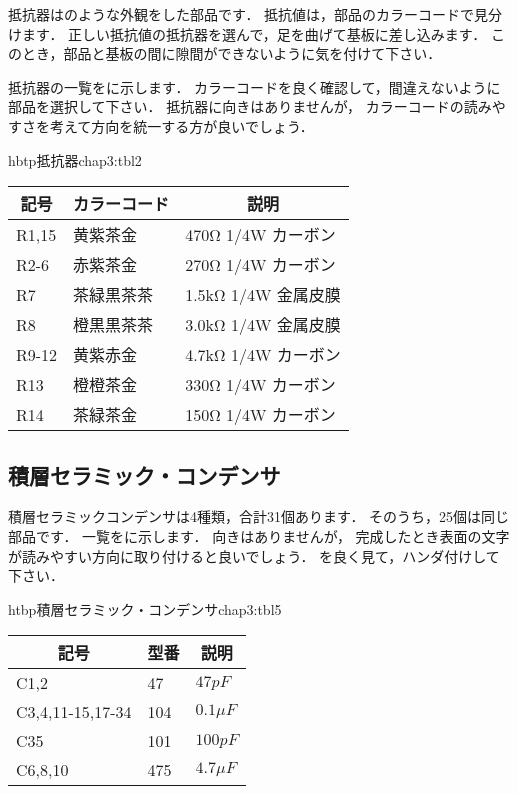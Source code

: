 抵抗器はのような外観をした部品です．
抵抗値は，部品のカラーコードで見分けます．
正しい抵抗値の抵抗器を選んで，足を曲げて基板に差し込みます．
このとき，部品と基板の間に隙間ができないように気を付けて下さい．


抵抗器の一覧をに示します．
カラーコードを良く確認して，間違えないように部品を選択して下さい．
抵抗器に向きはありませんが，
カラーコードの読みやすさを考えて方向を統一する方が良いでしょう．

\begin{mytable}{hbtp}{抵抗器}{chap3:tbl2}
\begin{tabular}{|l|l|l|}
\hline
\multicolumn{1}{|c|}{記号} &
\multicolumn{1}{c|}{カラーコード} &
\multicolumn{1}{c|}{説明} \\
\hline
R1,15 & 黄紫茶金   & 470Ω  1/4W カーボン \\
R2-6  & 赤紫茶金   & 270Ω  1/4W カーボン \\
R7    & 茶緑黒茶茶 & 1.5kΩ 1/4W 金属皮膜 \\
R8    & 橙黒黒茶茶 & 3.0kΩ 1/4W 金属皮膜 \\
R9-12 & 黄紫赤金   & 4.7kΩ 1/4W カーボン \\
R13   & 橙橙茶金   & 330Ω  1/4W カーボン \\
R14   & 茶緑茶金   & 150Ω  1/4W カーボン \\
\hline
\end{tabular}
\end{mytable}

\subsection{積層セラミック・コンデンサ}
積層セラミックコンデンサは4種類，合計31個あります．
そのうち，25個は同じ部品です．
一覧をに示します．
向きはありませんが，
完成したとき表面の文字が読みやすい方向に取り付けると良いでしょう．
を良く見て，ハンダ付けして下さい．

\begin{mytable}{htbp}{積層セラミック・コンデンサ}{chap3:tbl5}
\begin{tabular}{|l|l|l|}
\hline
\multicolumn{1}{|c|}{記号} &
\multicolumn{1}{c|}{型番} &
\multicolumn{1}{c|}{説明} \\
\hline
C1,2             &  47 & $  47 pF $    \\
C3,4,11-15,17-34 & 104 & $ 0.1 \mu F $ \\
C35              & 101 & $ 100 pF $    \\
C6,8,10          & 475 & $ 4.7 \mu F $ \\
\hline
\end{tabular}
\end{mytable}

